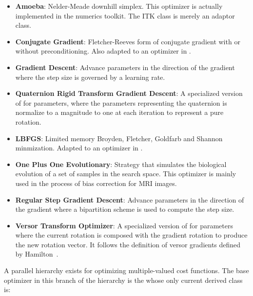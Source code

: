 \begin{itemize}

\item \textbf{Amoeba}: Nelder-Meade downhill simplex.  This optimizer is
actually implemented in the  numerics toolkit.  The ITK class
 is merely an adaptor class.

\item \textbf{Conjugate Gradient}: Fletcher-Reeves form 
of conjugate gradient with or without preconditioning. Also adapted to an
optimizer in .

\item \textbf{Gradient Descent}: Advance parameters in the direction of the
gradient where the step size is governed by a learning rate. 

\item \textbf{Quaternion Rigid Transform Gradient Descent}: 
A specialized version of  for
 parameters, where the parameters representing
the quaternion is normalize to a magnitude to one at each iteration to
represent a pure rotation.

\item \textbf{LBFGS}: Limited memory Broyden, Fletcher, Goldfarb
and Shannon minmization. Adapted to an optimizer in .

\item \textbf{One Plus One Evolutionary}: Strategy that simulates the
biological evolution of a set of samples in the search space. This optimizer
is mainly used in the process of bias correction for MRI images.

\item \textbf{Regular Step Gradient Descent}: Advance parameters in the
direction of the gradient where a bipartition scheme is used to compute
the step size. 

\item \textbf{Versor Transform Optimizer}: A specialized version of
 for 
parameters  where the current rotation is composed with the gradient rotation
to produce the new rotation vector. It follows the definition of versor
gradients defined by Hamilton~\cite{Hamilton1866}.

\end{itemize}

A parallel hierarchy exists for optimizing multiple-valued cost functions. The
base optimizer in this branch of the hierarchy is the
 whose only current derived class
is:

